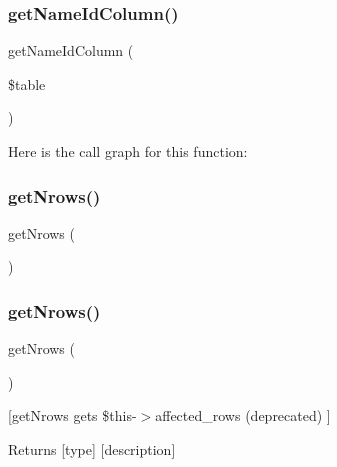 \subsubsection{\texorpdfstring{get\+Name\+Id\+Column()}{getNameIdColumn()}}
{\footnotesize\ttfamily get\+Name\+Id\+Column (\begin{DoxyParamCaption}\item[{}]{\$table }\end{DoxyParamCaption})}

Here is the call graph for this function\+:
\mbox{\label{class_my_sql_conection_a9b6d440558c6276d62ea45b6727a8b32}} 
\subsubsection{\texorpdfstring{get\+Nrows()}{getNrows()}\hspace{0.1cm}{\footnotesize\ttfamily [1/2]}}
{\footnotesize\ttfamily get\+Nrows (\begin{DoxyParamCaption}{ }\end{DoxyParamCaption})}

\mbox{\label{class_my_sql_conection_a9b6d440558c6276d62ea45b6727a8b32}} 
\subsubsection{\texorpdfstring{get\+Nrows()}{getNrows()}\hspace{0.1cm}{\footnotesize\ttfamily [2/2]}}
{\footnotesize\ttfamily get\+Nrows (\begin{DoxyParamCaption}{ }\end{DoxyParamCaption})}

\mbox{[}get\+Nrows gets \$this-\/$>$affected\+\_\+rows (deprecated) \mbox{]} \begin{DoxyReturn}{Returns}
\mbox{[}type\mbox{]} \mbox{[}description\mbox{]} 
\end{DoxyReturn}
\mbox{\label{class_my_sql_conection_ae077eb8a032a325ceb939bfabfa5f472}} 
